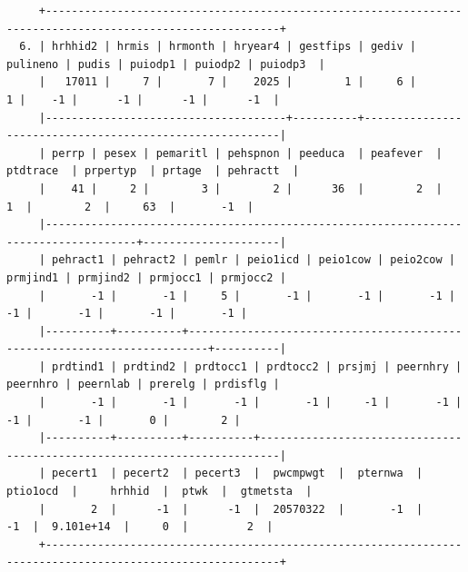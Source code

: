 \documentclass[
]{book}
\begin{document}
\begin{verbatim}
     +----------------------------------------------------------------------------------------------------------+
  6. | hrhhid2 | hrmis | hrmonth | hryear4 | gestfips | gediv | pulineno | pudis | puiodp1 | puiodp2 | puiodp3  |
     |   17011 |     7 |       7 |    2025 |        1 |     6 |        1 |    -1 |      -1 |      -1 |      -1  |
     |-------------------------------------+----------+---------------------------------------------------------|
     | perrp | pesex | pemaritl | pehspnon | peeduca  | peafever  | ptdtrace  | prpertyp  | prtage  | pehractt  |
     |    41 |     2 |        3 |        2 |      36  |        2  |        1  |        2  |     63  |       -1  |
     |------------------------------------------------------------------------------------+---------------------|
     | pehract1 | pehract2 | pemlr | peio1icd | peio1cow | peio2cow | prmjind1 | prmjind2 | prmjocc1 | prmjocc2 |
     |       -1 |       -1 |     5 |       -1 |       -1 |       -1 |       -1 |       -1 |       -1 |       -1 |
     |----------+----------+-------------------------------------------------------------------------+----------|
     | prdtind1 | prdtind2 | prdtocc1 | prdtocc2 | prsjmj | peernhry | peernhro | peernlab | prerelg | prdisflg |
     |       -1 |       -1 |       -1 |       -1 |     -1 |       -1 |       -1 |       -1 |       0 |        2 |
     |----------+----------+----------+-------------------------------------------------------------------------|
     | pecert1  | pecert2  | pecert3  |  pwcmpwgt  |  pternwa  |  ptio1ocd  |     hrhhid  |  ptwk  |  gtmetsta  |
     |       2  |      -1  |      -1  |  20570322  |       -1  |        -1  |  9.101e+14  |     0  |         2  |
     +----------------------------------------------------------------------------------------------------------+


\end{verbatim}
\end{document}
